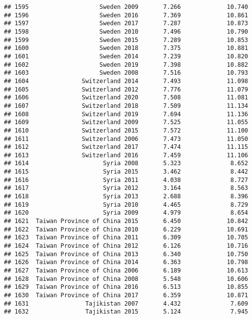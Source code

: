 \documentclass[
]{article}
\begin{document}
\begin{verbatim}
## 1595                    Sweden 2009       7.266             10.740
## 1596                    Sweden 2016       7.369             10.861
## 1597                    Sweden 2017       7.287             10.873
## 1598                    Sweden 2010       7.496             10.790
## 1599                    Sweden 2015       7.289             10.853
## 1600                    Sweden 2018       7.375             10.881
## 1601                    Sweden 2014       7.239             10.820
## 1602                    Sweden 2019       7.398             10.882
## 1603                    Sweden 2008       7.516             10.793
## 1604               Switzerland 2014       7.493             11.098
## 1605               Switzerland 2012       7.776             11.079
## 1606               Switzerland 2020       7.508             11.081
## 1607               Switzerland 2018       7.509             11.134
## 1608               Switzerland 2019       7.694             11.136
## 1609               Switzerland 2009       7.525             11.055
## 1610               Switzerland 2015       7.572             11.100
## 1611               Switzerland 2006       7.473             11.050
## 1612               Switzerland 2017       7.474             11.115
## 1613               Switzerland 2016       7.459             11.106
## 1614                     Syria 2008       5.323              8.652
## 1615                     Syria 2015       3.462              8.442
## 1616                     Syria 2011       4.038              8.727
## 1617                     Syria 2012       3.164              8.563
## 1618                     Syria 2013       2.688              8.396
## 1619                     Syria 2010       4.465              8.729
## 1620                     Syria 2009       4.979              8.654
## 1621  Taiwan Province of China 2015       6.450             10.842
## 1622  Taiwan Province of China 2010       6.229             10.691
## 1623  Taiwan Province of China 2011       6.309             10.705
## 1624  Taiwan Province of China 2012       6.126             10.716
## 1625  Taiwan Province of China 2013       6.340             10.750
## 1626  Taiwan Province of China 2014       6.363             10.798
## 1627  Taiwan Province of China 2006       6.189             10.613
## 1628  Taiwan Province of China 2008       5.548             10.606
## 1629  Taiwan Province of China 2016       6.513             10.855
## 1630  Taiwan Province of China 2017       6.359             10.871
## 1631                Tajikistan 2007       4.432              7.609
## 1632                Tajikistan 2015       5.124              7.945

\end{verbatim}
\end{document}

